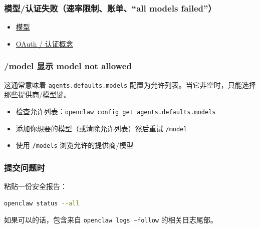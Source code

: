 \subsubsection{模型/认证失败（速率限制、账单、“all models failed”）}


\begin{itemize}
  \item \href{/cli/models}{模型}
  \item \href{/concepts/oauth}{OAuth / 认证概念}
\end{itemize}


\subsubsection{/model 显示 model not allowed}


这通常意味着 \texttt{agents.defaults.models} 配置为允许列表。当它非空时，只能选择那些提供商/模型键。

\begin{itemize}
  \item 检查允许列表：\texttt{openclaw config get agents.defaults.models}
  \item 添加你想要的模型（或清除允许列表）然后重试 \texttt{/model}
  \item 使用 \texttt{/models} 浏览允许的提供商/模型
\end{itemize}


\subsubsection{提交问题时}


粘贴一份安全报告：

\begin{lstlisting}[language=bash]
openclaw status --all
\end{lstlisting}


如果可以的话，包含来自 \texttt{openclaw logs --follow} 的相关日志尾部。


\clearpage
